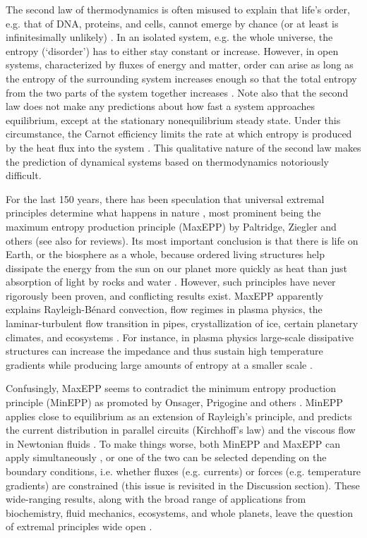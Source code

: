 \documentclass[aps,prl,reprint,singlecolumn,superscriptaddress]{revtex4}
\begin{document}
The second law of thermodynamics is often misused to explain that life’s order, e.g. that of DNA, proteins, and cells, 
cannot emerge by chance (or at least is infinitesimally unlikely) \cite{schopf02}. In an isolated system, e.g. the whole universe, the 
entropy (‘disorder’) has to either stay constant or increase. However, in open systems, characterized by fluxes of 
energy and matter, order can arise as long as the entropy of the {surrounding system} increases enough so that the total 
entropy {from the two parts of the system together} increases \cite{schroedinger44}. Note also that the second law does not make 
any predictions about how fast 
a system approaches equilibrium, {except at the stationary nonequilibrium steady state. Under this circumstance, the 
Carnot efficiency limits the rate at which entropy is produced by the heat flux into the system \cite{yoshida08,kawazura12}}.
This qualitative nature of the second law makes the prediction of dynamical systems based on thermodynamics notoriously 
difficult.

For the last 150 years, there has been speculation that universal extremal principles determine what happens in 
nature \cite{helmholtz1968,rayleigh1913,onsager1931ab}, 
most prominent being the maximum entropy production principle (MaxEPP) by Paltridge, Ziegler and others \cite{paltridge78,ziegler77} 
(see also \cite{whitfield05,dewar_book14} for reviews). Its most important conclusion 
is that there is life on Earth, or the biosphere as a whole, because ordered living structures help dissipate the energy from the sun on 
our planet more quickly as heat than just absorption of light by rocks and water \cite{kleidon04,england13,england15}. 
However, such principles have never rigorously been proven, and conflicting results exist. MaxEPP apparently explains 
Rayleigh-Bénard convection, flow regimes in plasma physics, the laminar-turbulent flow transition in pipes, 
crystallization of ice, certain planetary climates, and ecosystems \cite{lorenz01,whitfield05,martyushev07,jesus12}. 
For instance, in plasma physics large-scale dissipative structures can increase the impedance and thus sustain high temperature
gradients while producing large amounts of entropy at a smaller scale \cite{yoshida08}.

Confusingly, MaxEPP seems to contradict the minimum entropy production principle (MinEPP) as promoted by Onsager, Prigogine and
others \cite{onsager1931ab,pregogine67}. MinEPP applies close to equilibrium as an extension of Rayleigh's principle, and predicts the 
current distribution in parallel circuits (Kirchhoff’s law) and the viscous flow in Newtonian fluids \cite{jaynes80}. To make things worse, 
both MinEPP and MaxEPP can apply simultaneously \cite{niven10}, or one of the two can be selected depending on the boundary conditions, 
i.e. whether fluxes (e.g. currents) or forces (e.g. temperature gradients) are constrained \cite{yoshida08,kawazura10,kawazura12} 
(this issue is revisited in the Discussion section). These wide-ranging results, along with the broad range of applications from biochemistry, 
fluid mechanics, ecosystems, and whole planets, leave the question of extremal principles wide open \cite{martyushev10}.
\end{document}
